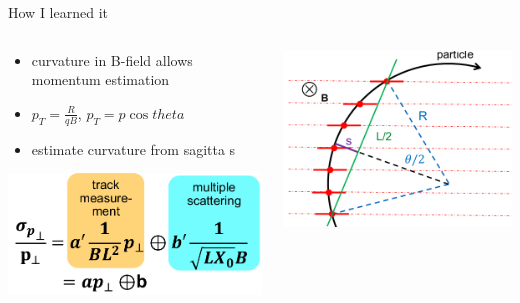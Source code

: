 \documentclass[presentation]{etp-beamer-fancy}
\begin{document}
\begin{frame}[label={sec:orgb75ba41}]{How I learned it}
\begin{columns}
\begin{column}{0.6\columnwidth}
\begin{itemize}
\item curvature in B-field allows momentum estimation
\item \(p_T = \frac{R}{qB}\), \(p_T = p \cos{theta}\)
\item estimate curvature from sagitta s
\end{itemize}
\begin{center}
\includegraphics[width=.5\textwidth]{./figures/tracking_uncertainty_hartmann.png}
\end{center}
\end{column}
\begin{column}{0.4\columnwidth}
\begin{center}
\includegraphics[width=.9\linewidth]{./figures/tracking_sagitta_hartmann.png}
\end{center}
\end{column}
\end{columns}
\end{frame}
\end{document}
